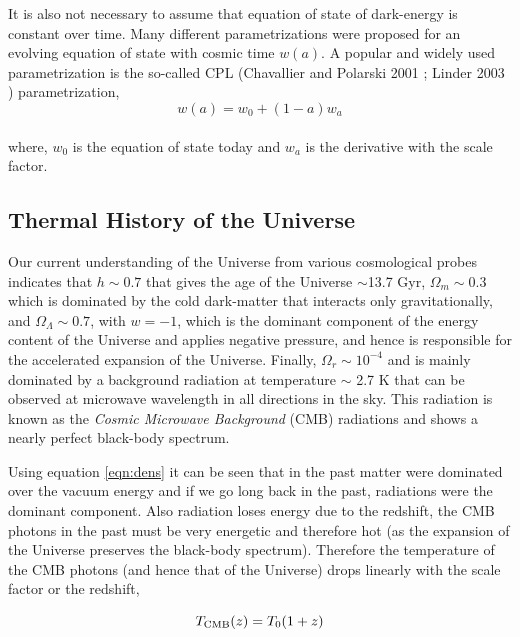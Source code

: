 \documentclass[
  11pt,
  twoside,
  openright,
  titlepage,
  headings=optiontoheadandtoc
]{scrbook}
\begin{document}
It is also not necessary to assume that equation of state of dark-energy
is constant over time. Many different parametrizations were proposed
for an evolving equation of state with cosmic time $w(a)$. A popular
and widely used parametrization is the so-called CPL (Chavallier and Polarski
2001 \cite{2001IJMPD..10..213C}; Linder 2003 \citep{2003PhRvL..90i1301L}) parametrization,
\begin{equation}
	w(a) = w_0 + (1-a)w_a
\end{equation}
\\
where, $w_0$ is the equation of state today and $w_a$ is the derivative with
the scale factor. 

\subsection{Thermal History of the Universe}

Our current understanding of the Universe from various cosmological probes 
indicates that $h \sim 0.7$ that gives the
age of the Universe $\sim$13.7 Gyr, $\Omega_m \sim 0.3$ which is dominated
by the cold dark-matter that interacts only gravitationally, and 
$\Omega_{\Lambda} \sim 0.7$, with $w=-1$, 
which is the dominant component of the energy
content of the Universe and applies negative pressure, and hence is responsible
for the accelerated expansion of the Universe. Finally, $\Omega_r \sim 10^{-4}$
and is mainly dominated by a background radiation at temperature $\sim$ 2.7 K that
can be observed at microwave wavelength in all directions in the sky. This radiation is
known as the {\it Cosmic Microwave Background} (CMB) radiations and shows a nearly
perfect black-body spectrum.

Using equation \ref{eqn:dens}
it can be seen that in the past matter were dominated over the vacuum 
energy and if we go long back in the past, radiations were the dominant 
component. Also  radiation loses energy due 
to the redshift, the CMB photons in the past must be very energetic and
therefore hot (as the expansion of the Universe preserves the black-body 
spectrum). Therefore the temperature of the CMB photons (and hence that 
of the Universe) drops linearly with the scale factor or the redshift,

\begin{equation}
	T_{\rm CMB}(z) = T_0(1+z)
\end{equation}
\end{document}
